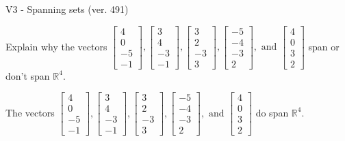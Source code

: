 \begin{exercise}
  \begin{exerciseTitle}V3 - Spanning sets (ver. 491)\end{exerciseTitle}
  \begin{exerciseStatement}
    Explain why the vectors \(\left[\begin{array}{r}
4 \\
0 \\
-5 \\
-1
\end{array}\right] , \left[\begin{array}{r}
3 \\
4 \\
-3 \\
-1
\end{array}\right] , \left[\begin{array}{r}
3 \\
2 \\
-3 \\
3
\end{array}\right] , \left[\begin{array}{r}
-5 \\
-4 \\
-3 \\
2
\end{array}\right] , \text{ and } \left[\begin{array}{r}
4 \\
0 \\
3 \\
2
\end{array}\right]\) span or don't span \(\mathbb{R}^4\). 
	


  \end{exerciseStatement}
  \begin{exerciseAnswer}
   The vectors \(\left[\begin{array}{r}
4 \\
0 \\
-5 \\
-1
\end{array}\right] , \left[\begin{array}{r}
3 \\
4 \\
-3 \\
-1
\end{array}\right] , \left[\begin{array}{r}
3 \\
2 \\
-3 \\
3
\end{array}\right] , \left[\begin{array}{r}
-5 \\
-4 \\
-3 \\
2
\end{array}\right] , \text{ and } \left[\begin{array}{r}
4 \\
0 \\
3 \\
2
\end{array}\right]\) 
  	 do  
	span \(\mathbb{R}^4\).
  



\end{exerciseAnswer}
\end{exercise}
